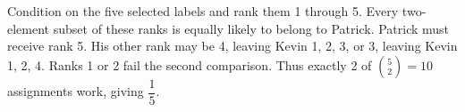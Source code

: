 Condition on the five selected labels and rank them 1 through 5. Every two-element subset of these ranks is equally likely to belong to Patrick. Patrick must receive rank 5. His other rank may be 4, leaving Kevin 1, 2, 3, or 3, leaving Kevin 1, 2, 4. Ranks 1 or 2 fail the second comparison. Thus exactly 2 of $\binom52=10 $ assignments work, giving $\boxed{\dfrac{1}{5}}$.

